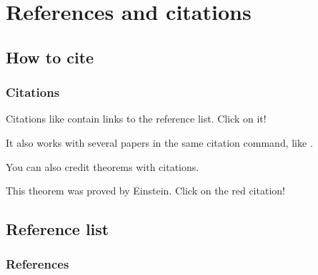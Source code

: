 \documentclass{beamer}
\begin{document}
\section{References and citations}

\subsection{How to cite}

\begin{frame}
    \frametitle{Citations}

    Citations like \cite{knuth-fa} contain links to the reference list. Click on it!

    It also works with several papers in the same citation command, like \cite{dirac,knuthwebsite}.

    You can also credit theorems with citations.

    \begin{theorem}
        This theorem was proved by Einstein. Click on the red citation!
    \end{theorem}

\end{frame}

\subsection{Reference list}

\begin{frame}
    \frametitle{References}

    
    

\end{frame}
\end{document}

